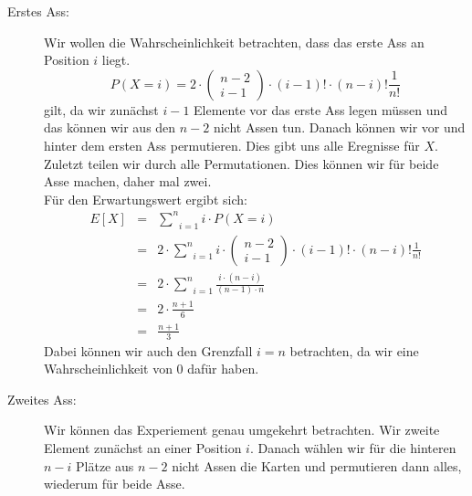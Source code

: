 \documentclass[11pt,a4paper,ngerman]{article}
\begin{document}
\begin{description}
    \item[Erstes Ass:] Wir wollen die Wahrscheinlichkeit betrachten, dass das erste Ass an Position $i$ liegt.
        \[
            P(X=i) = 2 \cdot \begin{pmatrix} n - 2 \\ i - 1\end{pmatrix} \cdot (i-1)! \cdot (n-i)! \frac{1}{n!}
        \]
        gilt, da wir zunächst $i-1$ Elemente vor das erste Ass legen müssen und das können wir aus den $n-2$ nicht Assen tun.
        Danach können wir vor und hinter dem ersten Ass permutieren. Dies gibt uns alle Eregnisse für $X$. Zuletzt teilen wir
        durch alle Permutationen. Dies können wir für beide Asse machen, daher mal zwei.\\

        Für den Erwartungswert ergibt sich:
        \[\begin{array}{rcl}
            E[X] &=& \underset{i=1}{\overset{n}{\sum}} i \cdot P(X=i)\\
                &=& 2\cdot\underset{i=1}{\overset{n}{\sum}} i \cdot \begin{pmatrix} n - 2 \\ i - 1\end{pmatrix} \cdot (i-1)! \cdot (n-i)! \frac{1}{n!}\\
                &=& 2\cdot\underset{i=1}{\overset{n}{\sum}} \frac{i\cdot (n-i)}{(n-1)\cdot n}\\
                &=& 2\cdot \frac{n+1}{6}\\
                &=& \frac{n+1}{3}
        \end{array}\]
        Dabei können wir auch den Grenzfall $i=n$ betrachten, da wir eine Wahrscheinlichkeit von $0$ dafür haben.
    \item[Zweites Ass:]
        Wir können das Experiement genau umgekehrt betrachten. Wir zweite Element zunächst an einer Position $i$. Danach wählen wir
        für die hinteren $n-i$ Plätze aus $n-2$ nicht Assen die Karten und permutieren dann alles, wiederum für beide Asse.


\end{description}
\end{document}
